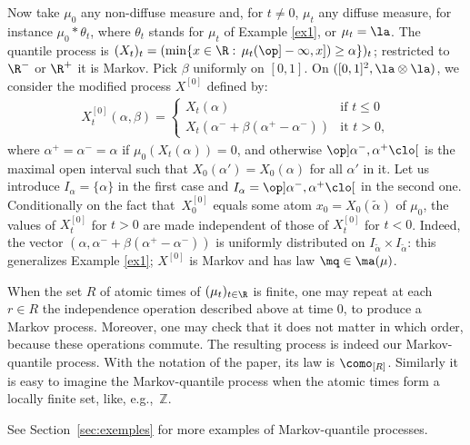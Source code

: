 \begin{ex}\label{ex2}Now take $\mu_0$ any non-diffuse measure and, for $t\neq 0$, $\mu_t$ any diffuse measure, for instance $\mu_0\ast \theta_t$, where $\theta_t$ stands for $\mu_t$ of Example \ref{ex1}, or $\mu_t=\la$. The quantile process is $(X_t)_t=(\min\{x\in \R:\,\mu_t(\op]-\infty,x])\geq \alpha\})_t$; restricted to $\R^-$ or $\R^+$ it is Markov. Pick $\beta$ uniformly on $[0,1]$. On $([0,1]^2,\la\otimes \la)$, we consider the modified process $X^{[0]}$ defined by:
\begin{align*}
X_t^{[0]}(\alpha,\beta)=
\begin{cases}
X_t(\alpha)&\text{if }t\leq 0\\
X_t(\alpha^-+\beta(\alpha^+-\alpha^-))&\text{it }t>0,
\end{cases}
\end{align*}
where $\alpha^+=\alpha^-=\alpha$ if $\mu_0(X_t(\alpha))=0$, and otherwise $\op]\alpha^-,\alpha^+\clo[$ is the maximal open interval such that $X_0(\alpha')=X_0(\alpha)$ for all $\alpha'$ in it. Let us introduce $I_\alpha=\{\alpha\}$ in the first case and $I_\alpha=\op]\alpha^-,\alpha^+\clo[$ in the second one. Conditionally on the fact that~$X_0^{[0]}$ equals some atom $x_0=X_0(\tilde\alpha)$ of $\mu_0$, the values of $X^{[0]}_t$ for $t>0$ are made independent of those of $X^{[0]}_t$ for $t<0$. Indeed, the vector $(\alpha,\alpha^- +\beta(\alpha^+-\alpha^-))$ is uniformly distributed on $I_{\tilde\alpha}\times I_{\tilde\alpha}$: this generalizes Example \ref{ex1}; $X^{[0]}$ is Markov and has law\/ $\mq\in \ma(\mu)$.
\end{ex}

\begin{ex}When the set $R$ of atomic times of $(\mu_t)_{t\in \R}$ is finite, one may repeat at each $r\in R$ the independence operation described above at time $0$, to produce a Markov process. Moreover, one may check that it does not matter in which order, \hbox{because} these operations commute. The resulting process is indeed our Markov-quantile process. With the notation of the paper, its law is $\como_{[R]}$. Similarly it is easy to imagine the Markov-quantile process when the atomic times form a locally finite set, like, e.g.,~$\mathbb{Z}$.
\end{ex}

\begin{rem} See Section~\ref{sec:exemples} for more examples of Markov-quantile processes.
\end{rem}

